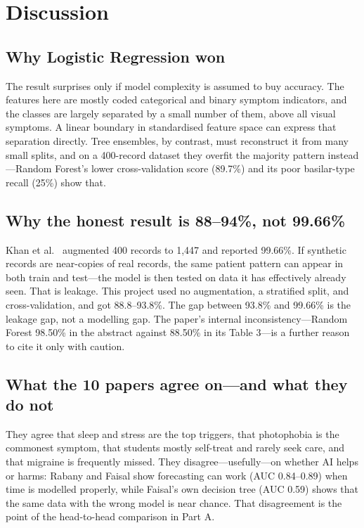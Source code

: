 \documentclass[conference]{IEEEtran}
\begin{document}
\section{Discussion}
\subsection{Why Logistic Regression won}
The result surprises only if model complexity is assumed to buy accuracy. The features here are mostly coded categorical and binary symptom indicators, and the classes are largely separated by a small number of them, above all visual symptoms. A linear boundary in standardised feature space can express that separation directly. Tree ensembles, by contrast, must reconstruct it from many small splits, and on a 400-record dataset they overfit the majority pattern instead---Random Forest's lower cross-validation score (89.7\%) and its poor basilar-type recall (25\%) show that.

\subsection{Why the honest result is 88--94\%, not 99.66\%}
Khan et al.~\cite{khan2024} augmented 400 records to 1,447 and reported 99.66\%. If synthetic records are near-copies of real records, the same patient pattern can appear in both train and test---the model is then tested on data it has effectively already seen. That is leakage. This project used no augmentation, a stratified split, and cross-validation, and got 88.8--93.8\%. The gap between 93.8\% and 99.66\% is the leakage gap, not a modelling gap. The paper's internal inconsistency---Random Forest 98.50\% in the abstract against 88.50\% in its Table 3---is a further reason to cite it only with caution.

\subsection{What the 10 papers agree on---and what they do not}
They agree that sleep and stress are the top triggers, that photophobia is the commonest symptom, that students mostly self-treat and rarely seek care, and that migraine is frequently missed. They disagree---usefully---on whether AI helps or harms: Rabany and Faisal show forecasting can work (AUC 0.84--0.89) when time is modelled properly, while Faisal's own decision tree (AUC 0.59) shows that the same data with the wrong model is near chance. That disagreement is the point of the head-to-head comparison in Part A.
\end{document}
